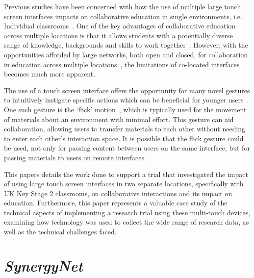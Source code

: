 \documentclass[twocolumn]{svjour3}          %
\begin{document}
Previous studies have been concerned with how the use of multiple large touch screen interfaces impacts on collaborative education in single environments, i.e. Individual classrooms~\citep{mohammed:2012,kreitmayer:2013,mercier:2015}.
One of the key advantages of collaborative education across multiple locations is that it allows students with a potentially diverse range of knowledge, backgrounds and skills to work together~\citep{kizilcec:2013}.
However, with the opportunities afforded by large networks, both open and closed, for collaboration in education across multiple locations~\citep{daradoumis:2000,mcconnell:2012}, the limitations of co-located interfaces becomes much more apparent.

The use of a touch screen interface offers the opportunity for many novel gestures to intuitively instigate specific actions which can be beneficial for younger users~\citep{kim:2007,wu:2003,rick:2009}.
One such gesture is the `flick' motion~\citep{reetz-et-al:2006}, which is typically used for the movement of materials about an environment with minimal effort.
This gesture can aid collaboration, allowing users to transfer materials to each other without needing to enter each other's interaction space.
 It is possible that the flick gesture could be used, not only for passing content between users on the same interface, but for passing materials to users on remote interfaces.

This papers details the work done to support a trial that investigated the impact of using large touch screen interfaces in two separate locations, specifically with UK Key Stage 2 classrooms, on collaborative interactions and its impact on education. 
Furthermore, this paper represents a valuable case study of the technical aspects of implementing a research trial using these multi-touch devices, examining how technology was used to collect the wide range of research data, as well as the technical challenges faced.


\section{{\emph{SynergyNet}}}
\end{document}
